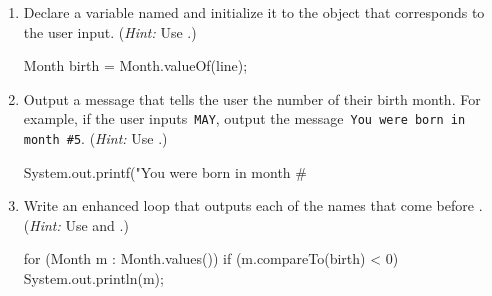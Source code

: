 \begin{enumerate}

\item Declare a variable named  and initialize it to the  object that corresponds to the user input.
(\textit{Hint:} Use .)

\begin{answer}[2em]
\begin{javaans}
Month birth = Month.valueOf(line);
\end{javaans}
\end{answer}

\item Output a message that tells the user the number of their birth month.
For example, if the user inputs \,\verb|MAY|, output the message \,\verb|You were born in month #5|.
(\textit{Hint:} Use .)

\begin{answer}[2em]
\begin{javaans}
System.out.printf("You were born in month #%
\end{javaans}
\end{answer}

\item Write an enhanced  loop that outputs each of the  names that come before .
(\textit{Hint:} Use  and .)

\begin{answer}[8em]
\begin{javaans}
for (Month m : Month.values()) {
    if (m.compareTo(birth) < 0) {
        System.out.println(m);
    }
}
\end{javaans}
\end{answer}

\end{enumerate}


%
%
%
%
%
%
